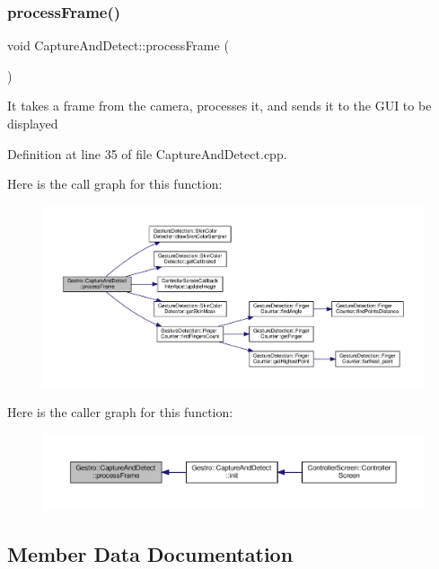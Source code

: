 \subsubsection{\texorpdfstring{process\+Frame()}{processFrame()}}
{\footnotesize\ttfamily void Capture\+And\+Detect\+::process\+Frame (\begin{DoxyParamCaption}{ }\end{DoxyParamCaption})}

It takes a frame from the camera, processes it, and sends it to the G\+UI to be displayed 

Definition at line 35 of file Capture\+And\+Detect.\+cpp.

Here is the call graph for this function\+:
\nopagebreak
\begin{figure}[H]
\begin{center}
\leavevmode
\includegraphics[width=350pt]{class_gestro_1_1_capture_and_detect_ac7e70bbcade4e0023541c556ee7cb34e_cgraph}
\end{center}
\end{figure}
Here is the caller graph for this function\+:
\nopagebreak
\begin{figure}[H]
\begin{center}
\leavevmode
\includegraphics[width=350pt]{class_gestro_1_1_capture_and_detect_ac7e70bbcade4e0023541c556ee7cb34e_icgraph}
\end{center}
\end{figure}


\subsection{Member Data Documentation}
\mbox{\label{class_gestro_1_1_capture_and_detect_a7050e1a4e0bcf87954d43edb2cce6a3d}} 
